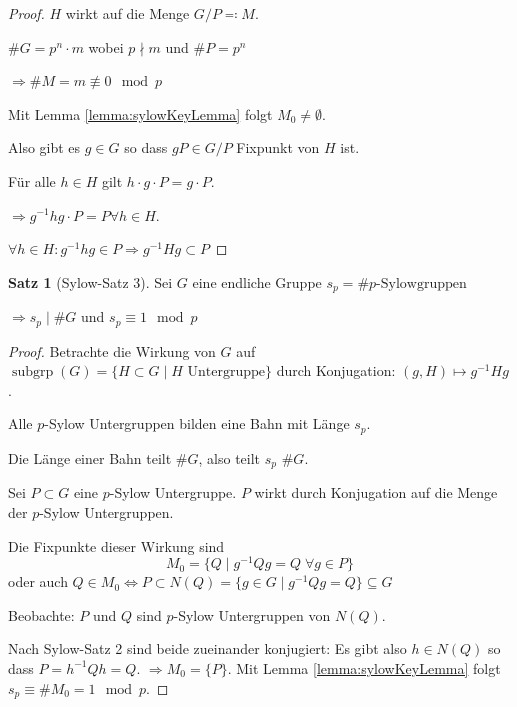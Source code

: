 \documentclass[12pt,parskip=full]{scrartcl}
\theoremstyle{definition}
\newtheorem{theorem}{Satz}[section]
\theoremstyle{remark}
\begin{document}
	\begin{proof}
		$H$ wirkt auf die Menge $G/P \eqqcolon M$.
		
		$\#G = p^n \cdot m$ wobei $p \nmid m$ und $\#P = p^n$
		
		$\Rightarrow \#M = m \not\equiv 0 \mod p$
		
		Mit Lemma \ref{lemma:sylowKeyLemma} folgt $M_0 \neq \emptyset$.
		
		Also gibt es $g \in G$ so dass $gP \in G/P$ Fixpunkt von $H$ ist.
		
		Für alle $h \in H$ gilt $h \cdot g \cdot P = g \cdot P$.
		
		$\Rightarrow g^{-1} h g \cdot P = P \forall h \in H$.
		
		$\forall h \in H: g^{-1} h g \in P \Rightarrow g^{-1} H g \subset P$
	\end{proof}

	\begin{theorem}[Sylow-Satz 3]
		Sei $G$ eine endliche Gruppe $s_p = \#\text{$p$-Sylowgruppen}$
		
		$\Rightarrow s_p \mid \#G$ und $s_p \equiv 1 \mod p$
	\end{theorem}

	\begin{proof}
		Betrachte die Wirkung von $G$ auf $\operatorname{subgrp}(G) = \{ H \subset G \mid \text{$H$ Untergruppe} \}$ durch Konjugation: $(g, H) \mapsto g^{-1} H g$.
		
		Alle $p$-Sylow Untergruppen bilden eine Bahn mit Länge $s_p$.
		
		Die Länge einer Bahn teilt $\#G$, also teilt $s_p$ $\#G$.
		
		Sei $P \subset G$ eine $p$-Sylow Untergruppe. $P$ wirkt durch Konjugation auf die Menge der $p$-Sylow Untergruppen.
		
		Die Fixpunkte dieser Wirkung sind
		\begin{equation*}
			M_0 = \{ Q \mid g^{-1} Q g = Q \; \forall g \in P \}
		\end{equation*}
		oder auch $Q \in M_0 \Leftrightarrow P \subset N(Q) = \{ g \in G \mid g^{-1} Q g = Q \} \subseteq G$
		
		Beobachte: $P$ und $Q$ sind $p$-Sylow Untergruppen von $N(Q)$.
		
		Nach Sylow-Satz 2 sind beide zueinander konjugiert: Es gibt also $h \in N(Q)$ so dass $P = h^{-1} Q h = Q$. $\Rightarrow M_0 = \{ P \}$. Mit Lemma \ref{lemma:sylowKeyLemma} folgt $s_p \equiv \# M_0 = 1 \mod p$.
	\end{proof}
\end{document}
